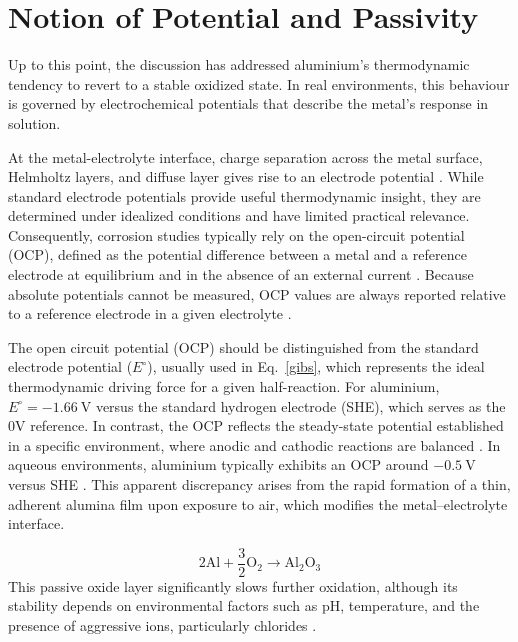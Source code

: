 \documentclass[11pt,twoside,a4paper]{report}
\begin{document}
\section{Notion of Potential and Passivity}
\label{potential}
Up to this point, the discussion has addressed aluminium's thermodynamic tendency to revert to a stable oxidized state. In real environments, this behaviour is governed by electrochemical potentials that describe the metal's response in solution.

At the metal-electrolyte interface, charge separation across the metal surface, Helmholtz layers, and diffuse layer gives rise to an electrode potential \cite{Vargel2020,Sastri2007,Ghali2010}. While standard electrode potentials provide useful thermodynamic insight, they are determined under idealized conditions and have limited practical relevance. Consequently, corrosion studies typically rely on the open-circuit potential (OCP), defined as the potential difference between a metal and a reference electrode at equilibrium and in the absence of an external current \cite{Vargel2020,Roberge2000}. Because absolute potentials cannot be measured, OCP values are always reported relative to a reference electrode in a given electrolyte \cite{Vargel2020,Sastri2007,Revie2008}.

The open circuit potential (OCP) should be distinguished from the standard electrode potential ($E^\circ$), usually used in Eq.~\ref{gibs}, which represents the ideal thermodynamic driving force for a given half-reaction. For aluminium, $E^\circ = -1.66\ \mathrm{V}$ versus the standard hydrogen electrode (SHE), which serves as the 0V reference. In contrast, the OCP reflects the steady-state potential established in a specific environment, where anodic and cathodic reactions are balanced \cite{Sastri2007,Revie2008,Marcus2011}. In aqueous environments, aluminium typically exhibits an OCP around $-0.5\ \mathrm{V}$ versus SHE \cite{Vargel2020,Revie2008}. This apparent discrepancy arises from the rapid formation of a thin, adherent alumina film upon exposure to air, which modifies the metal--electrolyte interface.

\begin{equation}
2\mathrm{Al} + \frac{3}{2} \mathrm{O}_2 \rightarrow \mathrm{Al}_2\mathrm{O}_3
\end{equation}
This passive oxide layer significantly slows further oxidation, although its stability depends on environmental factors such as pH, temperature, and the presence of aggressive ions, particularly chlorides \cite{Vargel2020,Sastri2007,Ghali2010,Revie2008}.
\end{document}
